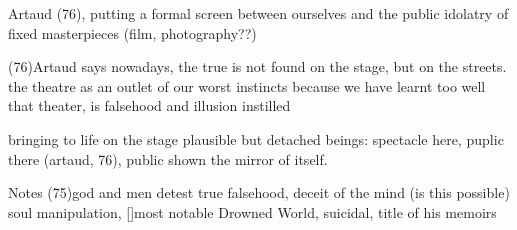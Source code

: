 \documentclass{article}
\begin{document}
Artaud (76), putting a formal screen between ourselves and the public 
idolatry of fixed masterpieces (film, photography??)


(76)Artaud says nowadays, the true is not found on the stage, but on the streets.
the theatre as an outlet of our worst instincts
because we have learnt too well that theater, is falsehood and illusion
instilled 

bringing to life on the stage plausible but detached beings:
spectacle here, puplic there (artaud, 76), public shown the mirror of itself.


Notes
(75)god and men detest true falsehood, 
deceit of the mind
(is this possible) soul manipulation, 
[]most notable Drowned World, suicidal, title of his memoirs

\nocite{*}	%
\printbibliography[title={Bibliography}] 
\end{document}
